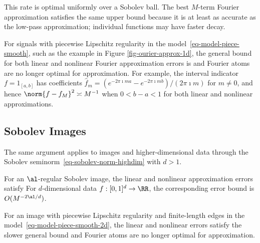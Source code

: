 This rate is optimal uniformly over a Sobolev ball. The best $M$-term Fourier approximation satisfies the same upper bound because it is at least as accurate as the low-pass approximation; individual functions may have faster decay.

For signals with piecewise Lipschitz regularity in the model~\eqref{eq-model-piece-smooth}, such as the example in Figure \ref{fig-ourier-approx-1d}, the general bound for both linear and nonlinear Fourier approximation errors is
and Fourier atoms are no longer optimal for approximation.
%
For example, the interval indicator $f=1_{[a,b]}$ has coefficients $\hat f_m=(e^{-2\pi\imath ma}-e^{-2\pi\imath mb})/(2\pi\imath m)$ for $m\neq0$, and hence
$\norm{f-f_M}^2\asymp M^{-1}$ when $0<b-a<1$ for both linear and nonlinear approximations.

\subsection{Sobolev Images}

The same argument applies to images and higher-dimensional data through the Sobolev seminorm~\eqref{eq-sobolev-norm-highdim} with $d>1$.

For an $\al$-regular Sobolev image, the linear and nonlinear approximation errors satisfy
For $d$-dimensional data $f : [0,1]^d \rightarrow \RR$, the corresponding error bound is $O(M^{-2\al/d})$.

For an image with piecewise Lipschitz regularity and finite-length edges in the model~\eqref{eq-model-piece-smooth-2d}, the linear and nonlinear errors satisfy the slower general bound
and Fourier atoms are no longer optimal for approximation.


